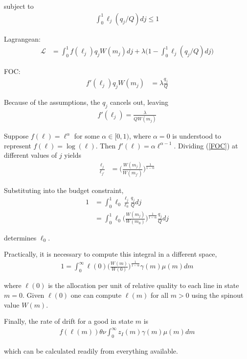 \documentclass[12pt,english]{article}
\theoremstyle{remark}
\begin{document}
subject to
\begin{align*}
	\int_0^1 \ell_j (q_j/Q) dj \le 1
\end{align*}

Lagrangean:
\begin{align*}
	\mathcal{L} &= \int_0^1 f(\ell_j) q_j W(m_j) dj  + \lambda \Big( 1 - \int_0^1 \ell_j (q_j/Q) dj \Big)
\end{align*}

FOC:
\begin{align*}
	f'(\ell_j) q_j W(m_j) &= \lambda \frac{q_j}{Q}
\end{align*}

Because of the assumptions, the $q_j$ cancels out, leaving
\begin{align}
	f'(\ell_j) =  \frac{\lambda}{Q W(m_j)} \label{FOC}
\end{align}

Suppose $f(\ell) = \ell^{\alpha}$ for some $\alpha \in [0,1)$, where $\alpha = 0$ is understood to represent $f(\ell) = \log(\ell)$. Then $f'(\ell) = \alpha \ell^{\alpha-1}$. Dividing (\ref{FOC}) at different values of $j$ yields
\begin{align}
	\frac{\ell_j}{\ell_{j'}} &= \Bigg(\frac{W(m_{j})}{W(m_{j'})}\Bigg) ^{\frac{1}{1-\alpha}} \label{laborRatio}
\end{align}

Substituting into the budget constraint,
\begin{align*}
	1 &= \int_0^1 \ell_0 \frac{\ell_j}{\ell_0} \frac{q_j}{Q} dj \\
	  &= \int_0^1 \ell_0 \Bigg(\frac{W(m_{j})}{W(m_0)}\Bigg) ^{\frac{1}{1-\alpha}} \frac{q_j}{Q} dj 
\end{align*}

determines $\ell_0$. 

Practically, it is necessary to compute this integral in a different space, 
\begin{align*}
	1 = \int_0^{\infty} \ell(0) \Bigg(\frac{W(m)}{W(0)}\Bigg) ^{\frac{1}{1-\alpha}} \gamma(m) \mu(m) dm 
\end{align*}

where $\ell(0)$ is the allocation per unit of relative quality to each line in state $m = 0$. Given $\ell(0)$ one can compute $\ell(m)$ for all $m > 0$ using the spinout value $W(m)$. 

Finally, the rate of drift for a good in state $m$ is
\begin{align*}
	f(\ell(m)) \theta \nu \int_0^{\infty} z_I(m) \gamma(m) \mu(m) dm 
\end{align*} 

which can be calculated readily from everything available. 
\end{document}

